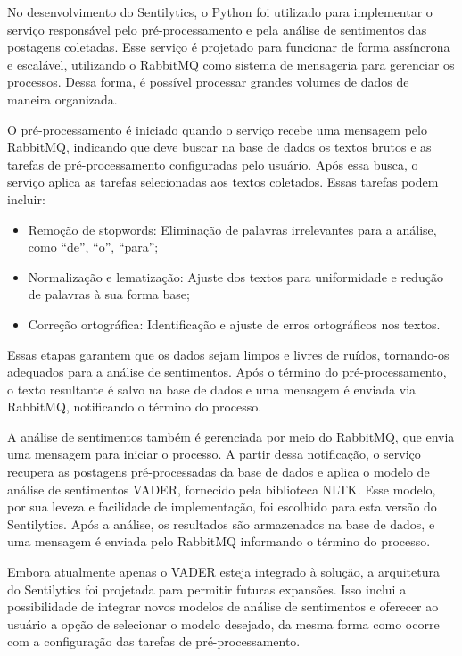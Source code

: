\documentclass[
	12pt,				%
	oneside,			%
	a4paper,			%
	english,			%
	french,				%
	spanish,			%
	brazil				%
	]{abntex2}
\begin{document}
No desenvolvimento do Sentilytics, o Python foi utilizado para
implementar o serviço responsável pelo pré-processamento e pela análise
de sentimentos das postagens coletadas. Esse serviço é projetado para
funcionar de forma assíncrona e escalável, utilizando o RabbitMQ como
sistema de mensageria para gerenciar os processos. Dessa forma, é
possível processar grandes volumes de dados de maneira organizada.

O pré-processamento é iniciado quando o serviço recebe uma mensagem pelo
RabbitMQ, indicando que deve buscar na base de dados os textos brutos e
as tarefas de pré-processamento configuradas pelo usuário. Após essa
busca, o serviço aplica as tarefas selecionadas aos textos coletados.
Essas tarefas podem incluir:

\begin{itemize}
\tightlist
\item
  Remoção de stopwords: Eliminação de palavras irrelevantes para a
  análise, como ``de'', ``o'', ``para'';
\item
  Normalização e lematização: Ajuste dos textos para uniformidade e
  redução de palavras à sua forma base;
\item
  Correção ortográfica: Identificação e ajuste de erros ortográficos nos
  textos.
\end{itemize}

Essas etapas garantem que os dados sejam limpos e livres de ruídos,
tornando-os adequados para a análise de sentimentos. Após o término do
pré-processamento, o texto resultante é salvo na base de dados e uma
mensagem é enviada via RabbitMQ, notificando o término do processo.

A análise de sentimentos também é gerenciada por meio do RabbitMQ, que
envia uma mensagem para iniciar o processo. A partir dessa notificação,
o serviço recupera as postagens pré-processadas da base de dados e
aplica o modelo de análise de sentimentos VADER, fornecido pela
biblioteca NLTK. Esse modelo, por sua leveza e facilidade de
implementação, foi escolhido para esta versão do Sentilytics. Após a
análise, os resultados são armazenados na base de dados, e uma mensagem
é enviada pelo RabbitMQ informando o término do processo.

Embora atualmente apenas o VADER esteja integrado à solução, a
arquitetura do Sentilytics foi projetada para permitir futuras
expansões. Isso inclui a possibilidade de integrar novos modelos de
análise de sentimentos e oferecer ao usuário a opção de selecionar o
modelo desejado, da mesma forma como ocorre com a configuração das
tarefas de pré-processamento.
\end{document}
